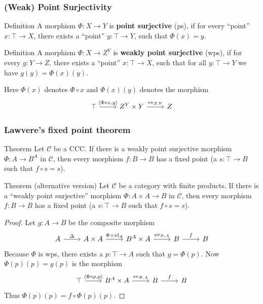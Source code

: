 \documentclass{beamer}
\begin{document}
\begin{frame}[fragile]
  \frametitle{(Weak) Point Surjectivity}
  \begin{block}{Definition}
    A morphism $\Phi : X \rightarrow Y$ is \textbf{point surjective} (ps), if for every ``point'' $x : \top \rightarrow X$, there exists a ``point'' $y : \top \rightarrow Y$, such that $\Phi (x) = y$.
  \end{block}
  \begin{block}{Definition}
    A morphism $\Phi : X \rightarrow Z ^ Y$ is \textbf{weakly point surjective} (wps), if for every $g : Y \rightarrow Z$, there exists a ``point'' $x : \top \rightarrow X$, such that for all $y : \top \rightarrow Y$ we have $g(y) = \Phi(x)(y)$.
    \end{block}
    Here $\Phi (x)$ denotes $\Phi \circ x$ and $\Phi (x)(y)$ denotes the morphism
    \[\begin{tikzcd}
	    \top & {Z^Y \times Y} & Z
	    \arrow["{\langle \Phi \circ x, y \rangle}", from=1-1, to=1-2]
	    \arrow["{\text{ev}_{Z,Y}}", from=1-2, to=1-3]
    \end{tikzcd}\]
\end{frame}

\begin{frame}
  \frametitle{Lawvere's fixed point theorem}
  \begin{alertblock}{Theorem}
    Let $\mathcal{C}$ be a CCC. If there is a weakly point surjective morphism $\Phi : A \rightarrow B ^ A$ in $\mathcal{C}$, then every morphism $f : B \rightarrow B$ has a fixed point (a $s : \top \rightarrow B$ such that $f \circ s = s$).
  \end{alertblock}
  \begin{alertblock}{Theorem (alternative version)}
    Let $\mathcal{C}$ be a category with finite products. If there is a ``weakly point surjective'' morphism $\Phi : A \times A \rightarrow B$ in $\mathcal{C}$, then every morphism $f : B \rightarrow B$ has a fixed point (a $s : \top \rightarrow B$ such that $f \circ s = s$).
  \end{alertblock}
\end{frame}

\begin{frame}[fragile]
  \begin{proof}
    Let $g : A \rightarrow B$ be the composite morphism
    \[\begin{tikzcd}
	    A & {A \times A} & {B^A\times A} & {B} & {B}
	    \arrow["\Delta", from=1-1, to=1-2]
	    \arrow["{\Phi \times \text{id}_A}", from=1-2, to=1-3]
	    \arrow["{\text{ev}_{B,A}}", from=1-3, to=1-4]
      \arrow["f", from=1-4, to=1-5]
    \end{tikzcd}\]
    Because $\Phi$ is wps, there exists a $p : \top \rightarrow A$ such that $g = \Phi(p)$. Now $\Phi(p)(p) = g(p)$ is the morphism
    \[\begin{tikzcd}
	    \top & {B^A \times A} & {B} & {B}
	    \arrow["{\langle \Phi \circ p, p \rangle}", from=1-1, to=1-2]
	    \arrow["{\text{ev}_{B,A}}", from=1-2, to=1-3]
      \arrow["f", from=1-3, to=1-4]
    \end{tikzcd}\]
  Thus $\Phi(p)(p) = f \circ \Phi(p)(p)$.
  \end{proof}
\end{frame}
\end{document}
